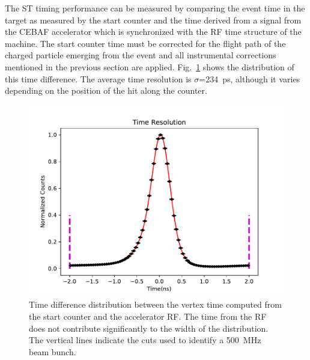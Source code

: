 The ST timing performance can be measured by comparing the event time in the target as measured by the start counter and the time derived from a signal from the CEBAF accelerator which is synchronized with the RF time structure of the machine. The start counter time must be corrected for the flight path of the charged particle emerging from the event and all instrumental corrections mentioned in the previous section are applied. Fig.~\ref{fig:st-time-resolution} shows the distribution of this time difference. The average time resolution is $\sigma$=234~ps, although it varies depending on the position of the hit along the counter. 


\begin{figure}[tbh]
  \centering
  \includegraphics[width=0.6\linewidth]{figures/st_tr_fit.pdf}
  \caption{Time difference distribution between the vertex time computed from the start counter and the accelerator RF. The time from the RF does not contribute significantly to the width of the distribution. The vertical lines indicate the cuts used to identify a 500~MHz beam bunch.}
                \label{fig:st-time-resolution}
\end{figure}  


